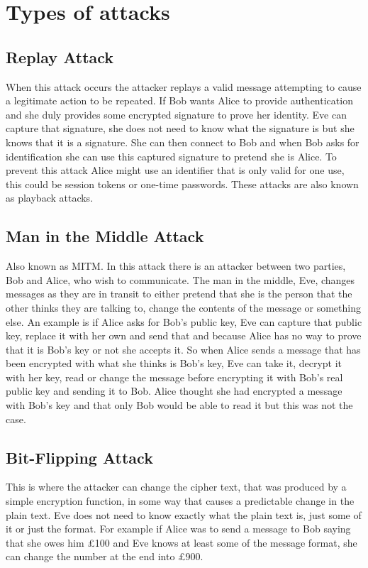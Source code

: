 \section{Types of attacks}

\subsection{Replay Attack}

When this attack occurs the attacker replays a valid message attempting to cause a legitimate action to be repeated. If Bob wants Alice to provide authentication and she duly provides some encrypted signature to prove her identity. Eve can capture that signature, she does not need to know what the signature is but she knows that it is a signature. She can then connect to Bob and when Bob asks for identification she can use this captured signature to pretend she is Alice. To prevent this attack Alice might use an identifier that is only valid for one use, this could be session tokens or one-time passwords. These attacks are also known as playback attacks.

\subsection{Man in the Middle Attack}
Also known as MITM. In this attack there is an attacker between two parties, Bob and Alice, who wish to communicate. The man in the middle, Eve, changes messages as they are in transit to either pretend that she is the person that the other thinks they are talking to, change the contents of the message or something else. An example is if Alice asks for Bob's public key, Eve can capture that public key, replace it with her own and send that and because Alice has no way to prove that it is Bob's key or not she accepts it. So when Alice sends a message that has been encrypted with what she thinks is Bob's key, Eve can take it, decrypt it with her key, read or change the message before encrypting it with Bob's real public key and sending it to Bob. Alice thought she had encrypted a message with Bob's key and that only Bob would be able to read it but this was not the case.

\subsection{Bit-Flipping Attack}
This is where the attacker can change the cipher text, that was produced by a simple encryption function, in some way that causes a predictable change in the plain text. Eve does not need to know exactly what the plain text is, just some of it or just the format. For example if Alice was to send a message to Bob saying that she owes him £100 and Eve knows at least some of the message format, she can change the number at the end into £900. 

